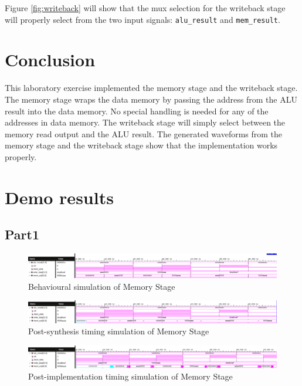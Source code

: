 \documentclass[CMPE]{../KGCOEReport}
\def\code#1{\texttt{#1}}
\begin{document}
    Figure \ref{fig:writeback} will show that the mux selection for the
    writeback stage will properly select from the two input signals:
    \code{alu\_result} and \code{mem\_result}.

	\pagebreak

    \section*{Conclusion}
    
    This laboratory exercise implemented the memory stage and the writeback
    stage. The memory stage wraps the data memory by passing the address
    from the ALU result into the data memory.
    No special handling is needed for any of the addresses in data memory.
    The writeback stage will simply select between the memory read output
    and the ALU result. The generated waveforms from the memory stage and 
    the writeback stage show that the implementation works properly.

    \pagebreak

    \section*{Demo results}
    
    \subsection*{Part1}
    \begin{figure}[h!]
        \centering
        \includegraphics[width=\textwidth]{img/memory_stage_behav}
        \caption{Behavioural simulation of Memory Stage}
        \label{fig:demo1}
	\end{figure}
    \begin{figure}[h!]
        \centering
        \includegraphics[width=\textwidth]{img/memory_stage_synth}
        \caption{Post-synthesis timing simulation of Memory Stage}
        \label{fig:demo1}
	\end{figure}
    \begin{figure}[h!]
        \centering
        \includegraphics[width=\textwidth]{img/memory_stage_impl}
        \caption{Post-implementation timing simulation of Memory Stage}
        \label{fig:demo1}
	\end{figure}
\end{document}
